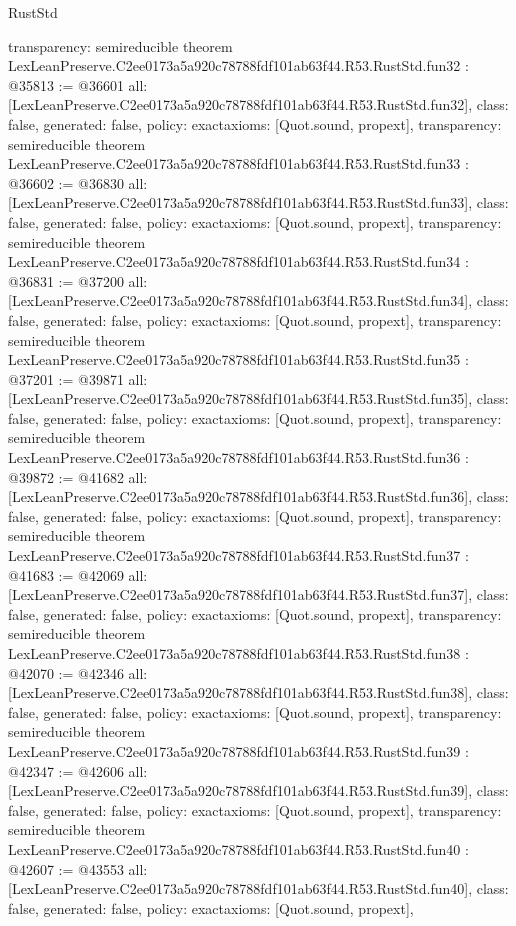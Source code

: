 \begin{lexlean}{RustStd}
\begin{coremodule}
{  transparency: semireducible
}
theorem LexLeanPreserve.C2ee0173a5a920c78788fdf101ab63f44.R53.RustStd.fun32 : @35813 := @36601 {
  all: [LexLeanPreserve.C2ee0173a5a920c78788fdf101ab63f44.R53.RustStd.fun32],
  class: false,
  generated: false,
  policy: exact{axioms: [Quot.sound, propext]},
  transparency: semireducible
}
theorem LexLeanPreserve.C2ee0173a5a920c78788fdf101ab63f44.R53.RustStd.fun33 : @36602 := @36830 {
  all: [LexLeanPreserve.C2ee0173a5a920c78788fdf101ab63f44.R53.RustStd.fun33],
  class: false,
  generated: false,
  policy: exact{axioms: [Quot.sound, propext]},
  transparency: semireducible
}
theorem LexLeanPreserve.C2ee0173a5a920c78788fdf101ab63f44.R53.RustStd.fun34 : @36831 := @37200 {
  all: [LexLeanPreserve.C2ee0173a5a920c78788fdf101ab63f44.R53.RustStd.fun34],
  class: false,
  generated: false,
  policy: exact{axioms: [Quot.sound, propext]},
  transparency: semireducible
}
theorem LexLeanPreserve.C2ee0173a5a920c78788fdf101ab63f44.R53.RustStd.fun35 : @37201 := @39871 {
  all: [LexLeanPreserve.C2ee0173a5a920c78788fdf101ab63f44.R53.RustStd.fun35],
  class: false,
  generated: false,
  policy: exact{axioms: [Quot.sound, propext]},
  transparency: semireducible
}
theorem LexLeanPreserve.C2ee0173a5a920c78788fdf101ab63f44.R53.RustStd.fun36 : @39872 := @41682 {
  all: [LexLeanPreserve.C2ee0173a5a920c78788fdf101ab63f44.R53.RustStd.fun36],
  class: false,
  generated: false,
  policy: exact{axioms: [Quot.sound, propext]},
  transparency: semireducible
}
theorem LexLeanPreserve.C2ee0173a5a920c78788fdf101ab63f44.R53.RustStd.fun37 : @41683 := @42069 {
  all: [LexLeanPreserve.C2ee0173a5a920c78788fdf101ab63f44.R53.RustStd.fun37],
  class: false,
  generated: false,
  policy: exact{axioms: [Quot.sound, propext]},
  transparency: semireducible
}
theorem LexLeanPreserve.C2ee0173a5a920c78788fdf101ab63f44.R53.RustStd.fun38 : @42070 := @42346 {
  all: [LexLeanPreserve.C2ee0173a5a920c78788fdf101ab63f44.R53.RustStd.fun38],
  class: false,
  generated: false,
  policy: exact{axioms: [Quot.sound, propext]},
  transparency: semireducible
}
theorem LexLeanPreserve.C2ee0173a5a920c78788fdf101ab63f44.R53.RustStd.fun39 : @42347 := @42606 {
  all: [LexLeanPreserve.C2ee0173a5a920c78788fdf101ab63f44.R53.RustStd.fun39],
  class: false,
  generated: false,
  policy: exact{axioms: [Quot.sound, propext]},
  transparency: semireducible
}
theorem LexLeanPreserve.C2ee0173a5a920c78788fdf101ab63f44.R53.RustStd.fun40 : @42607 := @43553 {
  all: [LexLeanPreserve.C2ee0173a5a920c78788fdf101ab63f44.R53.RustStd.fun40],
  class: false,
  generated: false,
  policy: exact{axioms: [Quot.sound, propext]},
}
\end{coremodule}
\end{lexlean}

